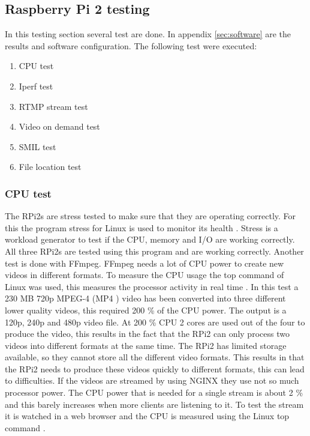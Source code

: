 \documentclass{sig-alternate-br}
\begin{document}
\subsection{Raspberry Pi 2  testing}\label{sec:test}

In this testing section several test are done. In appendix \ref{sec:software} are the results and software configuration. The following test were executed: 
\begin{enumerate}[topsep=0pt,itemsep=-1ex,partopsep=1ex,parsep=1ex] 
	\item CPU test
	\item Iperf test
	\item RTMP stream test
	\item Video on demand test
	\item SMIL test
	\item File location test
\end{enumerate}

\subsubsection{CPU test}

The RPi2s are stress tested to make sure that they are operating correctly. For this the program stress for Linux is used to monitor its health \cite{stress}. Stress is a workload generator to test if the CPU, memory and I/O are working correctly. All three RPi2s are tested using this program and are working correctly. \newline
Another test is done with FFmpeg. FFmpeg needs a lot of CPU power to create new videos in different formats. To measure the CPU usage the top command of Linux was used, this measures the processor activity in real time \cite{top}. In this test a 230 MB 720p MPEG-4 (MP4 ) video has been converted into three different lower quality videos, this required 200 \% of the CPU power. The output is a 120p, 240p and 480p video file. At 200 \% CPU 2 cores are used out of the four to produce the video, this results in the fact that the RPi2 can only process two videos into different formats at the same time. The RPi2 has limited storage available, so they cannot store all the different video formats. This results in that the RPi2 needs to produce  these videos quickly to different formats, this can lead to difficulties.  \newline
If the videos are streamed by using NGINX they use not so much processor power. The CPU power that is needed for a single stream is about 2 \% and this barely increases when more clients are listening to it. To test the stream it is watched in a web browser and the CPU is measured using the Linux top command \cite{top}. 
\end{document}
